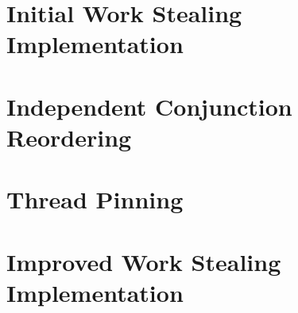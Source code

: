 

\section{Initial Work Stealing Implementation}
\label{sec:rts_work_stealing}



\section{Independent Conjunction Reordering}
\label{sec:rts_reorder}



\section{Thread Pinning}
\label{sec:rts_thread_pinning}



\section{Improved Work Stealing Implementation}
\label{sec:rts_work_stealing2}



%

